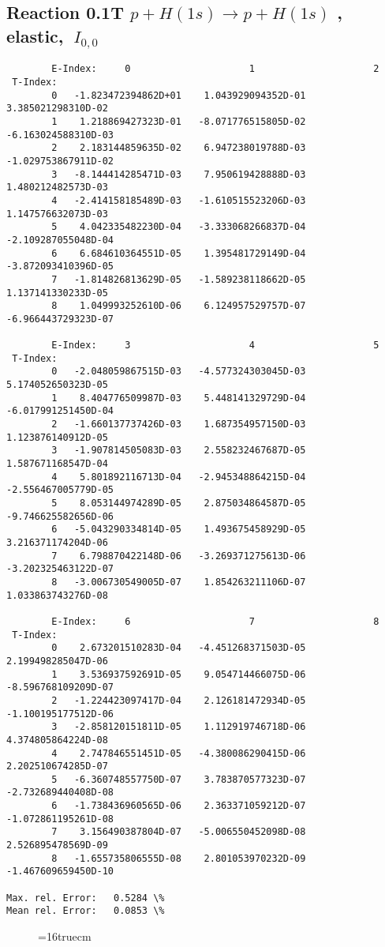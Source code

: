 \documentclass[12pt,dvipdfmx]{article}
\begin{document}
\subsection{
Reaction 0.1T  $p + H(1s) \rightarrow  p + H(1s)$
, elastic,
$\  I_{0,0}$
}




\begin{small}\begin{verbatim}
        E-Index:     0                     1                     2
 T-Index:
        0   -1.823472394862D+01    1.043929094352D-01    3.385021298310D-02
        1    1.218869427323D-01   -8.071776515805D-02   -6.163024588310D-03
        2    2.183144859635D-02    6.947238019788D-03   -1.029753867911D-02
        3   -8.144414285471D-03    7.950619428888D-03    1.480212482573D-03
        4   -2.414158185489D-03   -1.610515523206D-03    1.147576632073D-03
        5    4.042335482230D-04   -3.333068266837D-04   -2.109287055048D-04
        6    6.684610364551D-05    1.395481729149D-04   -3.872093410396D-05
        7   -1.814826813629D-05   -1.589238118662D-05    1.137141330233D-05
        8    1.049993252610D-06    6.124957529757D-07   -6.966443729323D-07

        E-Index:     3                     4                     5
 T-Index:
        0   -2.048059867515D-03   -4.577324303045D-03    5.174052650323D-05
        1    8.404776509987D-03    5.448141329729D-04   -6.017991251450D-04
        2   -1.660137737426D-03    1.687354957150D-03    1.123876140912D-05
        3   -1.907814505083D-03    2.558232467687D-05    1.587671168547D-04
        4    5.801892116713D-04   -2.945348864215D-04   -2.556467005779D-05
        5    8.053144974289D-05    2.875034864587D-05   -9.746625582656D-06
        6   -5.043290334814D-05    1.493675458929D-05    3.216371174204D-06
        7    6.798870422148D-06   -3.269371275613D-06   -3.202325463122D-07
        8   -3.006730549005D-07    1.854263211106D-07    1.033863743276D-08

        E-Index:     6                     7                     8
 T-Index:
        0    2.673201510283D-04   -4.451268371503D-05    2.199498285047D-06
        1    3.536937592691D-05    9.054714466075D-06   -8.596768109209D-07
        2   -1.224423097417D-04    2.126181472934D-05   -1.100195177512D-06
        3   -2.858120151811D-05    1.112919746718D-06    4.374805864224D-08
        4    2.747846551451D-05   -4.380086290415D-06    2.202510674285D-07
        5   -6.360748557750D-07    3.783870577323D-07   -2.732689440408D-08
        6   -1.738436960565D-06    2.363371059212D-07   -1.072861195261D-08
        7    3.156490387804D-07   -5.006550452098D-08    2.526895478569D-09
        8   -1.655735806555D-08    2.801053970232D-09   -1.467609659450D-10

Max. rel. Error:   0.5284 \%
Mean rel. Error:   0.0853 \%
\end{verbatim}\end{small}
\begin{figure} \label{0.1T}
\epsfxsize=16truecm
\end{figure}
\newpage
\end{document}
